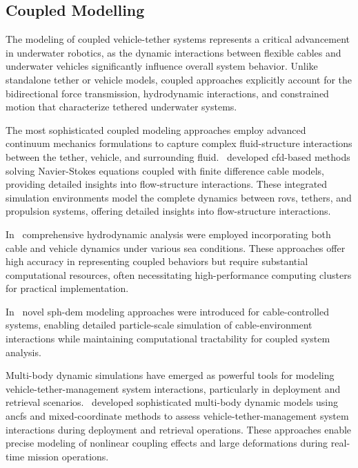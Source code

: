\subsection{Coupled Modelling}
\label{sota_sm_coupled_modelling}

The modeling of coupled vehicle-tether systems represents a critical advancement in underwater
robotics, as the dynamic interactions between flexible cables and underwater vehicles significantly
influence overall system behavior. Unlike standalone tether or vehicle models, coupled approaches
explicitly account for the bidirectional force transmission, hydrodynamic interactions, and
constrained motion that characterize tethered underwater systems.

The most sophisticated coupled modeling approaches employ advanced continuum mechanics formulations
to capture complex fluid-structure interactions between the tether, vehicle, and surrounding
fluid.~\cite{wuIntegratedHydrodynamicsControl2018} developed \ac{cfd}-based methods solving
Navier-Stokes equations coupled with finite difference cable models, providing detailed insights
into flow-structure interactions. These integrated simulation environments model the complete
dynamics between \acp{rov}, tethers, and propulsion systems, offering detailed insights into
flow-structure interactions.

In~\cite{xuHydrodynamicAnalysisTethered2022, xuNumericalSimulationHydrodynamics2022} comprehensive
hydrodynamic analysis were employed incorporating both cable and vehicle dynamics under various sea
conditions. These approaches offer high accuracy in representing coupled behaviors but require
substantial computational resources, often necessitating high-performance computing clusters for
practical implementation.

In~\cite{suSPHDEMModelingCablecontrolled2024} novel \ac{sph}-\ac{dem} modeling approaches were
introduced for cable-controlled systems, enabling detailed particle-scale simulation of
cable-environment interactions while maintaining computational tractability for coupled system
analysis.

Multi-body dynamic simulations have emerged as powerful tools for modeling
vehicle-tether-management system interactions, particularly in deployment and retrieval
scenarios.~\cite{htunSingularityfreeMultibodyModeling2021, htunTheoryApplicationAbsolute2022}
developed sophisticated multi-body dynamic models using \acp{ancf} and mixed-coordinate methods to
assess vehicle-tether-management system interactions during deployment and retrieval operations.
These approaches enable precise modeling of nonlinear coupling effects and large deformations
during real-time mission operations.

